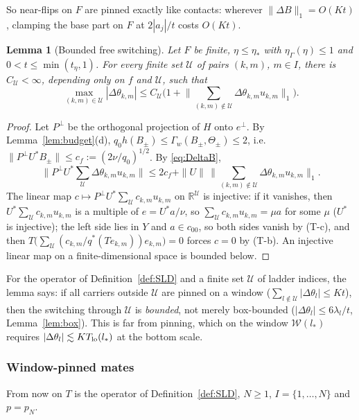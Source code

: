 \documentclass[10pt]{amsart}
\newtheorem{lemma}[theorem]{Lemma}
\theoremstyle{definition}
\theoremstyle{remark}
\newcommand{\R}{\mathbb R}
\begin{document}
So near-flips on $F$ are pinned exactly like contacts: wherever $\|\Delta
B\|_1=O(Kt)$, clamping the base part on $F$ at $2|a_j|/t$ costs $O(Kt)$.

\begin{lemma}[Bounded free switching]\label{lem:boundedfree}
Let $F$ be finite, $\eta\le\eta_*$ with $\eta_\Gamma(\eta)\le1$ and
$0<t\le\min(t_\eta,1)$.  For every finite set $\mathcal U$ of pairs $(k,m)$,
$m\in I$, there is $C_{\mathcal U}<\infty$, depending only on $f$ and $\mathcal U$, such that
\[
 \max_{(k,m)\in\mathcal U}|\Delta\theta_{k,m}|\le C_{\mathcal U}\Big(1+\Big\|\sum_{(k,m)\notin\mathcal U}
 \Delta\theta_{k,m}u_{k,m}\Big\|_1\Big).
\]
\end{lemma}

\begin{proof}
Let $P^\perp$ be the orthogonal projection of $H$ onto $e^\perp$.  By
Lemma~\ref{lem:budget}(d), $q_0h(B_\pm)\le\Gamma_w(B_\pm,\Theta_\pm)\le2$,
i.e.\ $\|P^\perp U^*B_\pm\|\le c_f:=(2\nu/q_0)^{1/2}$.  By
\eqref{eq:DeltaB},
\[
 \Big\|P^\perp U^*\sum_{\mathcal U}\Delta\theta_{k,m}u_{k,m}\Big\|\le2c_f+\|U\|\,
 \Big\|\sum_{(k,m)\notin\mathcal U}\Delta\theta_{k,m}u_{k,m}\Big\|_1 .
\]
The linear map $c\mapsto P^\perp U^*\sum_{\mathcal U}c_{k,m}u_{k,m}$ on $\R^{\mathcal U}$ is
injective: if it vanishes, then $U^*\sum_{\mathcal U}c_{k,m}u_{k,m}$ is a multiple of
$e=U^*a/\nu$, so $\sum_{\mathcal U}c_{k,m}u_{k,m}=\mu a$ for some $\mu$ ($U^*$ is
injective); the left side lies in $Y$ and $a\in c_{00}$, so both sides
vanish by (T-c), and then $T\big(\sum_{\mathcal U}(c_{k,m}/q^*(Te_{k,m}))e_{k,m}
\big)=0$ forces $c=0$ by (T-b).  An injective linear map on a
finite-dimensional space is bounded below.
\end{proof}

For the operator of Definition~\ref{def:SLD} and a finite set $\mathcal U$ of ladder
indices, the lemma says: if all carriers outside $\mathcal U$ are pinned on a window
($\sum_{l\notin\mathcal U}|\Delta\theta_l|\le Kt$), then the switching through $\mathcal U$
is \emph{bounded}, not merely box-bounded ($|\Delta\theta_l|\le6\lambda_l/t$,
Lemma~\ref{lem:box}).  This is far from pinning, which on the window
$\mathcal W(l_*)$ requires $|\Delta\theta_l|\lesssim KT_{\rm lo}(l_*)$ at
the bottom scale.

\subsubsection*{Window-pinned mates}
From now on $T$ is the operator of Definition~\ref{def:SLD}, $N\ge1$,
$I=\{1,\dots,N\}$ and $p=p_N$.
\end{document}
